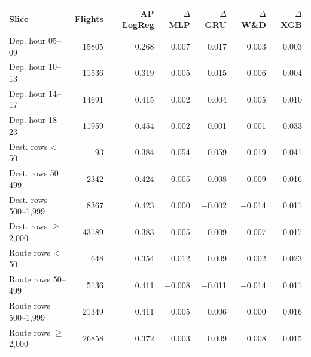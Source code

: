 \begin{tabular}{lrrrrrr}
\toprule
Slice & Flights & AP LogReg & $\Delta$ MLP & $\Delta$ GRU & $\Delta$ W\&D & $\Delta$ XGB \\
\midrule
Dep. hour 05--09 & 15805 & 0.268 & 0.007 & 0.017 & 0.003 & 0.003 \\
Dep. hour 10--13 & 11536 & 0.319 & 0.005 & 0.015 & 0.006 & 0.004 \\
Dep. hour 14--17 & 14691 & 0.415 & 0.002 & 0.004 & 0.005 & 0.010 \\
Dep. hour 18--23 & 11959 & 0.454 & 0.002 & 0.001 & 0.001 & 0.033 \\
Dest. rows < 50 & 93 & 0.384 & 0.054 & 0.059 & 0.019 & 0.041 \\
Dest. rows 50--499 & 2342 & 0.424 & $-$0.005 & $-$0.008 & $-$0.009 & 0.016 \\
Dest. rows 500--1,999 & 8367 & 0.423 & 0.000 & $-$0.002 & $-$0.014 & 0.011 \\
Dest. rows $\geq$ 2,000 & 43189 & 0.383 & 0.005 & 0.009 & 0.007 & 0.017 \\
Route rows < 50 & 648 & 0.354 & 0.012 & 0.009 & 0.002 & 0.023 \\
Route rows 50--499 & 5136 & 0.411 & $-$0.008 & $-$0.011 & $-$0.014 & 0.011 \\
Route rows 500--1,999 & 21349 & 0.411 & 0.005 & 0.006 & 0.000 & 0.016 \\
Route rows $\geq$ 2,000 & 26858 & 0.372 & 0.003 & 0.009 & 0.008 & 0.015 \\
\bottomrule
\end{tabular}
